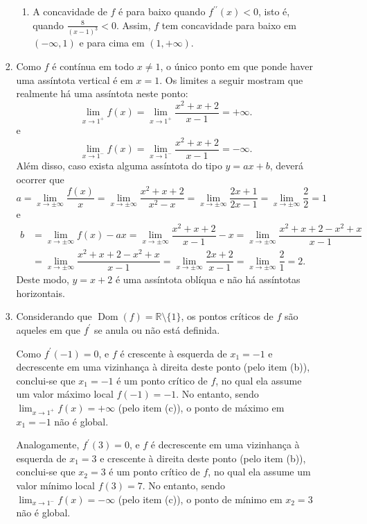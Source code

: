 \documentclass[12pt,a4paper]{article}
\newcommand*\dom[1]{\operatorname{Dom}\left(#1\right)}
\newcommand*\R{\mathbb{R}}
\begin{document}
\begin{enumerate}
\begin{itemize}
\begin{enumerate}
\begin{enumerate}
\item A concavidade de $f$ é para baixo quando $f^{\prime\prime}(x) < 0$, isto é, quando $\frac{8}{(x-1)^3} < 0$. Assim, $f$ tem concavidade para baixo em $(-\infty, 1)$ e para cima em $(1, +\infty)$.
\end{enumerate}

\item
Como $f$ é contínua em todo $x \neq 1$, o único ponto em que ponde haver uma assíntota vertical é em $x=1$. Os limites a seguir mostram que realmente há uma assíntota neste ponto:
\[
\lim_{x \to 1^+} f(x)
= \lim_{x \to 1^+} \dfrac{x^2 + x + 2}{x-1}
= +\infty.
\]
e
\[
\lim_{x \to 1^-} f(x)
= \lim_{x \to 1^-} \dfrac{x^2 + x + 2}{x-1}
= -\infty.
\]
Além disso, caso exista alguma assíntota do tipo $y = ax + b$, deverá ocorrer que
\[
a = \lim_{x \to \pm\infty} \frac{f(x)}{x}
= \lim_{x \to \pm\infty} \dfrac{x^2 + x + 2}{x^2-x}
= \lim_{x \to \pm\infty} \dfrac{2x + 1}{2x-1}
= \lim_{x \to \pm\infty} \dfrac{2}{2}
= 1
\]
e
\begin{align*}
b
& = \lim_{x \to \pm\infty} f(x) -ax
  = \lim_{x \to \pm\infty} \dfrac{x^2 + x + 2}{x-1} - x
  = \lim_{x \to \pm\infty} \dfrac{x^2 + x + 2 - x^2 + x}{x-1} \\
& = \lim_{x \to \pm\infty} \dfrac{x^2 + x + 2 - x^2 + x}{x-1}
  = \lim_{x \to \pm\infty} \dfrac{2x + 2}{x-1}
  = \lim_{x \to \pm\infty} \dfrac{2}{1}
  = 2.
\end{align*}
Deste modo, $y=x+2$ é uma assíntota oblíqua e não há assíntotas horizontais.

\item
Considerando que $\dom{f} = \R\setminus \{1\}$, os pontos críticos de $f$ são aqueles em que $f^\prime$ se anula ou não está definida.

Como $f^\prime(-1) = 0$, e $f$ é crescente à esquerda de $x_1 = -1$ e decrescente em uma vizinhança à direita deste ponto (pelo item (b)), conclui-se que $x_1=-1$ é um ponto crítico de $f$, no qual ela assume um valor máximo local $f(-1) = -1$. No entanto, sendo $\lim_{x \to 1^+} f(x) = +\infty$ (pelo item (c)), o ponto de máximo em $x_1 = -1$ não é global.

Analogamente, $f^\prime(3) = 0$, e $f$ é decrescente em uma vizinhança à esquerda de $x_1 = 3$ e crescente à direita deste ponto (pelo item (b)), conclui-se que $x_2=3$ é um ponto crítico de $f$, no qual ela assume um valor mínimo local $f(3) = 7$. No entanto, sendo $\lim_{x \to 1^-} f(x) = -\infty$ (pelo item (c)), o ponto de mínimo em $x_2 = 3$ não é global.


\end{enumerate}
\end{itemize}
\end{enumerate}
\end{document}
